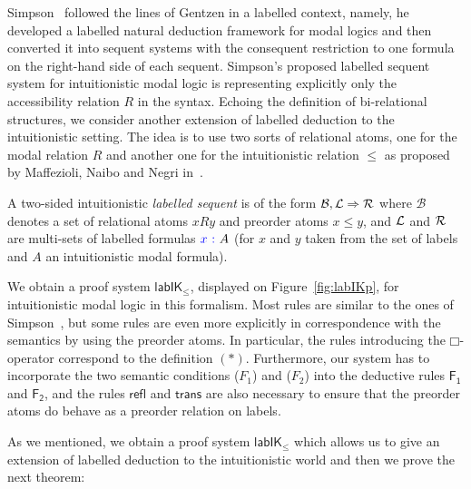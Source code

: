 \documentclass[twoside]{aiml18}
\newcommand{\B}{\mathcal{B}}
\newcommand*{\lab}{\mathsf{lab}}
\newcommand*{\IK}{\mathsf{IK}}
\newcommand*{\labIKp}{\lab\IK_{\le}}
\newcommand*{\BOX}{\mathord{\Box}}
\newcommand*{\labels}[2]{{\color{blue}{#1}\:\colon}{#2}}
\newcommand{\SEQ}{\Rightarrow}
\newcommand*{\rn}[1]  {\ensuremath{\mathsf{#1}}}
\newcommand*{\rel}{R}
\begin{document}
Simpson~\cite{Simpson} followed the lines of Gentzen in a labelled context, namely, he developed a labelled natural deduction framework for modal logics and then converted it into sequent systems with the consequent restriction to one formula on the right-hand side of each sequent. Simpson's proposed labelled sequent system for intuitionistic modal logic is representing explicitly only the accessibility relation $\rel$ in the syntax.
%
Echoing the definition of bi-relational structures, we consider another extension of labelled deduction to the intuitionistic setting. 
%
The idea is to use two sorts of relational atoms, one for the modal relation $\rel$ and another one for the intuitionistic relation $\leq$ as proposed by Maffezioli, Naibo and Negri in~\cite{Maffezioli}. 
%


\begin{definition}
A two-sided intuitionistic \emph{labelled sequent} is of the form $\B, \Left \SEQ \Right$ where $\B$ denotes a set of relational atoms $x \rel y$ and preorder atoms $x \le y$, and $\mathcal{L}$ and $\mathcal{R}$ are multi-sets of labelled formulas $\labels{x}{A}$ (for $x$ and $y$ taken from the set of labels and $A$ an intuitionistic modal formula).
\end{definition}



%
We obtain a proof system $\labIKp$, displayed on Figure~\ref{fig:labIKp}, for intuitionistic modal logic in this formalism. 
%
Most rules are similar to the ones of Simpson~\cite{Simpson}, but some rules are even more explicitly in correspondence with the semantics by using the preorder atoms. 
%
In particular, the rules introducing the $\BOX$-operator correspond to the definition $(\ast)$.
%
Furthermore, our system has to incorporate the two semantic conditions ($F_1$) and ($F_2$) into the deductive rules $\rn{F_1}$ and $\rn{F_2}$, and the rules $\rn{refl}$ and $\rn{trans}$ are also necessary to ensure that the preorder atoms do behave as a preorder relation on labels.

As we mentioned, we obtain a proof system $\labIKp$ which allows us to give an extension of labelled deduction to the intuitionistic world and then we prove the next theorem:

%
%
\end{document}
